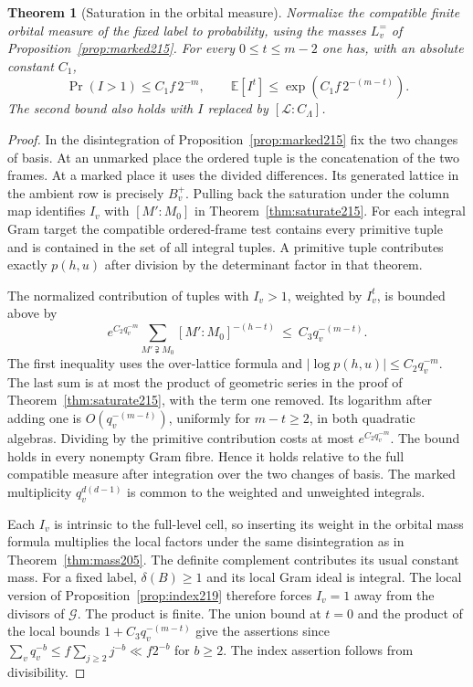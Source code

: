 \documentclass[a4paper,11pt]{article}
\newtheorem{theorem}[proposition]{Theorem}
\theoremstyle{definition}
\theoremstyle{remark}
\numberwithin{equation}{section}
\begin{document}
\begin{theorem}[Saturation in the orbital measure]\label{thm:moment219}
Normalize the compatible finite orbital measure of the fixed
label to probability, using the masses \(L_v^{=}\) of
Proposition~\ref{prop:marked215}. For every
\(0\le t\le m-2\) one has, with an absolute constant \(C_1\),
\[
 \Pr(I>1)\le C_1 f\,2^{-m},\qquad
 \mathbb E[I^t]\le\exp(C_1f\,2^{-(m-t)}).
\]
The second bound also holds with \(I\) replaced by
\([\mathcal L:C_\Lambda]\).
\end{theorem}
\begin{proof}
In the disintegration of Proposition~\ref{prop:marked215}
fix the two changes of basis. At an unmarked place the ordered
tuple is the concatenation of the two frames. At a marked place
it uses the divided differences. Its generated lattice in the
ambient row is precisely \(B_v^+\). Pulling back the saturation
under the column map identifies \(I_v\) with \([M':M_0]\) in
Theorem~\ref{thm:saturate215}. For each integral Gram target
the compatible ordered-frame test contains every primitive
tuple and is contained in the set of all integral tuples.
A primitive tuple contributes exactly \(p(h,u)\) after division
by the determinant factor in that theorem.

The normalized contribution of tuples with \(I_v>1\), weighted
by \(I_v^t\), is bounded above by
\[
 e^{C_2q_v^{-m}}\sum_{M'\supsetneqq M_0}[M':M_0]^{-(h-t)}
                  \ \le\ C_3q_v^{-(m-t)} .
\]
The first inequality uses the over-lattice formula and
\(|\log p(h,u)|\le C_2q_v^{-m}\). The last sum is at most the
product of geometric series in the proof of
Theorem~\ref{thm:saturate215}, with the term one removed.
Its logarithm after adding one is \(O(q_v^{-(m-t)})\), uniformly
for \(m-t\ge2\), in both quadratic algebras. Dividing by the
primitive contribution costs at most \(e^{C_2q_v^{-m}}\).
The bound holds in every nonempty Gram fibre. Hence it holds
relative to the full compatible measure after integration over
the two changes of basis. The marked multiplicity \(q_v^{d(d-1)}\)
is common to the weighted and unweighted integrals.

Each \(I_v\) is intrinsic to the full-level cell, so inserting
its weight in the orbital mass formula multiplies the local
factors under the same disintegration as in
Theorem~\ref{thm:mass205}. The definite complement contributes
its usual constant mass. For a fixed label, \(\delta(B)\ge1\)
and its local Gram ideal is integral. The local version of
Proposition~\ref{prop:index219} therefore forces \(I_v=1\)
away from the divisors of \(\mathcal G\). The product is finite.
The union bound at \(t=0\) and the product of the local bounds
\(1+C_3q_v^{-(m-t)}\) give the assertions since
\(\sum_v q_v^{-b}\le f\sum_{j\ge2}j^{-b}\ll f2^{-b}\) for
\(b\ge2\). The index assertion follows from divisibility.
\end{proof}
\end{document}
